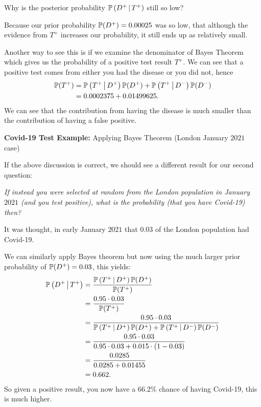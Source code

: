 \documentclass[10pt, a4paper]{article}
\begin{document}
Why is the posterior probability $\P\left(D ^ {+} \mmid T ^ {+}\right)$ still so low?

Because our prior probability $\P(D ^ {+}) = 0.00025$ was so low,
that although the evidence from $T ^ {+}$ increases our probability,
it still ends up as relatively small.

Another way to see this is if we examine the denominator of Bayes Theorem which gives us the probability of a positive test result $T ^ {+}$.
We can see that a positive test comes from either you had the disease or you did not,
hence
\begin{align*}
    \P(T ^ {+}) &= \P\left(T ^ {+} \mmid D ^ {+}\right)\P(D ^ {+}) + \P\left(T ^ {+} \mmid D ^ {-}\right)\P(D ^ {-}) \\
    &= 0.0002375 + 0.01499625.
\end{align*}
We can see that the contribution from having the disease is much smaller than the contribution of having a false positive.

\textbf{Covid-19 Test Example:}
Applying Bayes Theorem
(London January $2021$ case)

If the above discussion is correct,
we should see a different result for our second question:
\begin{center}
    \textit{If instead you were selected at random from the London population in January $2021$
    (and you test positive),
    what is the probability
    (that you have Covid-19)
    then?}
\end{center}

It was thought,
in early January $2021$ that $0.03$ of the London population had Covid-19.

We can similarly apply Bayes theorem but now using the much larger prior probability of $\P(D ^ {+}) = 0.03$,
this yields:
\begin{align*}
    \P\left(D ^ {+} \mmid T ^ {+}\right) &= \frac{\P\left(T ^ {+} \mmid D ^ {+}\right)\P(D ^ {+})}{\P(T ^ {+})} \\
    &= \frac{0.95 \cdot 0.03}{\P(T ^ {+})} \\
    &= \frac{0.95 \cdot 0.03}{\P\left(T ^ {+} \mmid D ^ {+}\right)\P(D ^ {+}) + \P\left(T ^ {+} \mmid D ^ {-}\right)\P(D ^ {-})} \\
    &= \frac{0.95 \cdot 0.03}{0.95 \cdot 0.03 + 0.015 \cdot (1 - 0.03)} \\
    &= \frac{0.0285}{0.0285 + 0.01455} \\
    &= 0.662.
\end{align*}
So given a positive result,
you now have a $66.2\%$ chance of having Covid-19,
this is much higher.
\end{document}
